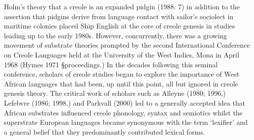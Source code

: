 \begin{styleStandard}
Holm’s theory that a creole is an expanded pidgin (1988: 7) in addition to the assertion that pidgins derive from language contact with sailor’s sociolect in maritime colonies placed Ship English at the core of creole genesis in studies leading up to the early 1980s. However, concurrently, there was a growing movement of substrate theories prompted by the second International Conference on Creole Languages held at the University of the West Indies, Mona in April 1968 (Hymes 1971 §proceedings.) In the decades following this seminal conference, scholars of creole studies began to explore the importance of West African languages that had been, up until this point, all but ignored in creole genesis theory. The critical work of scholars such as Alleyne (1980; 1996,) Lefebvre (1986; 1998,) and Parkvall (2000) led to a generally accepted idea that African substrates influenced creole phonology, syntax and semiotics whilst the superstrate European languages became synonymous with the term ‘lexifier’ and a general belief that they predominantly contributed lexical forms.
\end{styleStandard}

